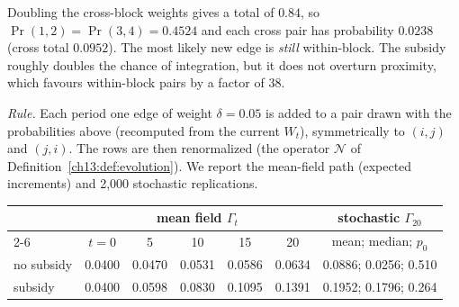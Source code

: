 \documentclass[../solutions_manual.tex]{subfiles}
\begin{document}
 Doubling the cross-block weights gives a total of $0.84$, so $\Pr(1,2) = \Pr(3,4) = 0.4524$ and each cross pair has probability $0.0238$ (cross total $0.0952$). The most likely new edge is \emph{still} within-block. The subsidy roughly doubles the chance of integration, but it does not overturn proximity, which favours within-block pairs by a factor of 38.

 \emph{Rule.} Each period one edge of weight $\delta = 0.05$ is added to a pair drawn with the probabilities above (recomputed from the current $W_t$), symmetrically to $(i,j)$ and $(j,i)$. The rows are then renormalized (the operator $\mathcal{N}$ of Definition~\ref{ch13:def:evolution}). We report the mean-field path (expected increments) and 2,000 stochastic replications.
\begin{center}
\end{center}
\begin{center}
\small
\begin{tabular}{lcccccc}
\toprule
& \multicolumn{5}{c}{mean field $\Gamma_t$} & stochastic $\Gamma_{20}$ \\
\cmidrule(lr){2-6}
& $t=0$ & 5 & 10 & 15 & 20 & mean; median; $p_0$ \\
\midrule
no subsidy & 0.0400 & 0.0470 & 0.0531 & 0.0586 & 0.0634 & 0.0886; 0.0256; 0.510 \\
subsidy & 0.0400 & 0.0598 & 0.0830 & 0.1095 & 0.1391 & 0.1952; 0.1796; 0.264 \\
\bottomrule
\end{tabular}
\end{center}
\end{document}
